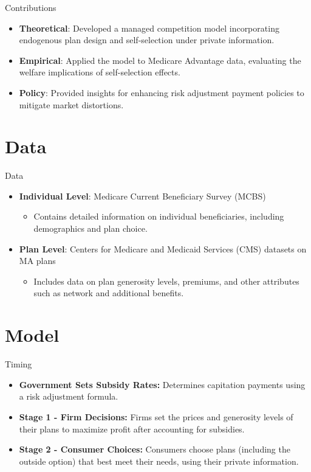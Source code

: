 \documentclass[professionalfonts, aspectratio=169]{beamer}
\begin{document}
\begin{frame}{Contributions}
  \begin{itemize}
    \item \textbf{Theoretical}: Developed a managed competition model incorporating endogenous plan design and self-selection under private information.
    \item \textbf{Empirical}: Applied the model to Medicare Advantage data, evaluating the welfare implications of self-selection effects.
    \item \textbf{Policy}: Provided insights for enhancing risk adjustment payment policies to mitigate market distortions.
  \end{itemize}
\end{frame}

\section{Data}

\begin{frame}{Data}
  \begin{itemize}
    \item \textbf{Individual Level}: Medicare Current Beneficiary Survey (MCBS)
    \begin{itemize}
      \item Contains detailed information on individual beneficiaries, including demographics and plan choice.
    \end{itemize}
    \item \textbf{Plan Level}: Centers for Medicare and Medicaid Services (CMS) datasets on MA plans
    \begin{itemize}
      \item Includes data on plan generosity levels, premiums, and other attributes such as network and additional benefits.
    \end{itemize}
  \end{itemize}
\end{frame}

\section{Model}
\begin{frame}{Timing}
  \begin{itemize}
    \item \textbf{Government Sets Subsidy Rates:} Determines capitation payments using a risk adjustment formula.
    \item \textbf{Stage 1 - Firm Decisions:} Firms set the prices and generosity levels of their plans to maximize profit after accounting for subsidies.
    \item \textbf{Stage 2 - Consumer Choices:} Consumers choose plans (including the outside option) that best meet their needs, using their private information.
  \end{itemize}
\end{frame}
\end{document}
